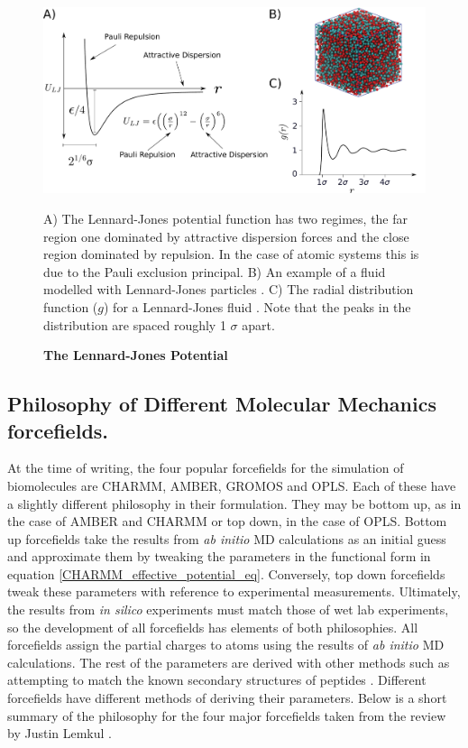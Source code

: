 \begin{figure}
	\begin{center}
		\includegraphics[width=\textwidth]{figures/LJ_figure.pdf}
	\end{center}
	\captionsetup{singlelinecheck = false, justification=raggedright}
	\caption[The Lennard-Jones Potential] {\textbf{The Lennard-Jones Potential}}{A) The Lennard-Jones potential function has two regimes, the far region one dominated by attractive dispersion forces and the close region dominated by repulsion. In the case of atomic systems this is due to the Pauli exclusion principal. B) An example of a fluid modelled with Lennard-Jones particles \cite{chari2019}. C) The radial distribution function ($g$) for a Lennard-Jones fluid \cite{morsali2005}. Note that the peaks in the distribution are spaced roughly 1 $\sigma$ apart. }
	\label{Lennard-Jones_figure}
\end{figure}

\subsection{Philosophy of Different Molecular Mechanics forcefields.}
\label{forcefields_review}
At the time of writing, the four popular forcefields for the simulation of biomolecules are CHARMM, AMBER, GROMOS and OPLS. Each of these have a slightly different philosophy in their formulation. They may be bottom up, as in the case of AMBER and CHARMM or top down, in the case of OPLS. Bottom up forcefields take the results from \textit{ab initio} MD calculations as an initial guess and approximate them by tweaking the parameters in the functional form in equation \ref{CHARMM_effective_potential_eq}. Conversely, top down forcefields tweak these parameters with reference to experimental measurements. Ultimately, the results from \textit{in silico} experiments must match those of wet lab experiments, so the development of all forcefields has elements of both philosophies. All forcefields assign the partial charges to atoms using the results of \textit{ab initio} MD calculations. The rest of the parameters are derived with other methods such as attempting to match the known secondary structures of peptides \cite{huang2016}. Different forcefields have different methods of deriving their parameters. Below is a short summary of the philosophy for the four major forcefields taken from the review by Justin Lemkul \cite{lemkul2020}. 

